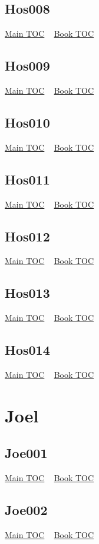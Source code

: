 \documentclass{book}
\begin{document}
  \section{Hos008}\hyperlink{toc}{Main TOC} ~ \hyperref[subsec:Hos]{Book TOC} 
  \section{Hos009}\hyperlink{toc}{Main TOC} ~ \hyperref[subsec:Hos]{Book TOC} 
  \section{Hos010}\hyperlink{toc}{Main TOC} ~ \hyperref[subsec:Hos]{Book TOC} 
  \section{Hos011}\hyperlink{toc}{Main TOC} ~ \hyperref[subsec:Hos]{Book TOC} 
  \section{Hos012}\hyperlink{toc}{Main TOC} ~ \hyperref[subsec:Hos]{Book TOC} 
  \section{Hos013}\hyperlink{toc}{Main TOC} ~ \hyperref[subsec:Hos]{Book TOC} 
  \section{Hos014}\hyperlink{toc}{Main TOC} ~ \hyperref[subsec:Hos]{Book TOC} 
  \chapter{Joel} \label{subsec:Joe} \begin{multicols}{2} \minitoc \end{multicols}
  \section{Joe001}\hyperlink{toc}{Main TOC} ~ \hyperref[subsec:Joe]{Book TOC} 
  \section{Joe002}\hyperlink{toc}{Main TOC} ~ \hyperref[subsec:Joe]{Book TOC} 
\end{document}
